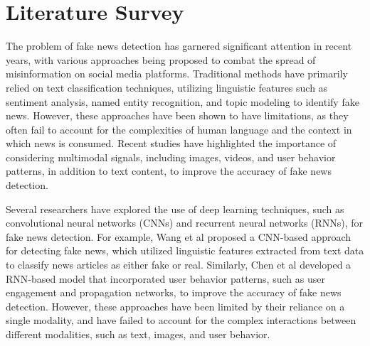 \documentclass[conference]{IEEEtran}
\begin{document}
\begin{abstract}
The expected outcomes of this research include a significant improvement in fake news detection accuracy, as well as the development of a robust and scalable system that can be applied to real-world social media platforms. The findings of this study will contribute to the ongoing efforts to combat misinformation, providing valuable insights into the effectiveness of multimodal fake news detection approaches. By demonstrating the potential of hybrid architectures to improve detection accuracy and identify fake news at an early stage, this research aims to inform the development of more effective countermeasures against misinformation.

Keywords: Multimodal Fake News Detection, Transformer-Based NLP, Graph Neural Networks, Computer Vision Models, Social Media Misinformation
\end{abstract}

\section{Literature Survey}
The problem of fake news detection has garnered significant attention in recent years, with various approaches being proposed to combat the spread of misinformation on social media platforms. Traditional methods have primarily relied on text classification techniques, utilizing linguistic features such as sentiment analysis, named entity recognition, and topic modeling to identify fake news. However, these approaches have been shown to have limitations, as they often fail to account for the complexities of human language and the context in which news is consumed. Recent studies have highlighted the importance of considering multimodal signals, including images, videos, and user behavior patterns, in addition to text content, to improve the accuracy of fake news detection.

Several researchers have explored the use of deep learning techniques, such as convolutional neural networks (CNNs) and recurrent neural networks (RNNs), for fake news detection. For example, Wang et al proposed a CNN-based approach for detecting fake news, which utilized linguistic features extracted from text data to classify news articles as either fake or real. Similarly, Chen et al developed a RNN-based model that incorporated user behavior patterns, such as user engagement and propagation networks, to improve the accuracy of fake news detection. However, these approaches have been limited by their reliance on a single modality, and have failed to account for the complex interactions between different modalities, such as text, images, and user behavior.
\end{document}
